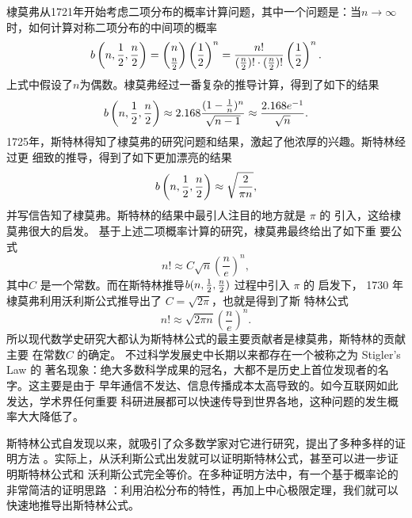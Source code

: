 {棣莫弗从1721年开始考虑二项分布的概率计算问题，其中一个问题是：当$n \rightarrow
\infty $时，如何计算对称二项分布的中间项的概率
$$ b\left(n, {1\over2}, {n \over 2}\right) = \binom{n}{{n \over 2}} 
\left(\frac{1}{2}\right)^n 
= \frac{n!}{({n\over 2})! \cdot ({n \over 2})!} \left(\frac{1}{2}\right)^n .$$
上式中假设了$n$为偶数。棣莫弗经过一番复杂的推导计算，得到了如下的结果
$$ b\left(n, {1\over2}, {n\over2}\right) \approx  2.168 \frac{(1 - {1\over n})^n} {\sqrt{n-1}} 
\approx \frac{2.168 e^{-1}}{\sqrt{n}}.$$
1725年，斯特林得知了棣莫弗的研究问题和结果，激起了他浓厚的兴趣。斯特林经过更
细致的推导，得到了如下更加漂亮的结果
$$ b\left(n, {1\over2}, {n\over2}\right) \approx \sqrt{\frac{2}{\pi n}} ,$$
并写信告知了棣莫弗。斯特林的结果中最引人注目的地方就是 $\pi$ 的
引入，这给棣莫弗很大的启发。 基于上述二项概率计算的研究，棣莫弗最终给出了如下重
要公式
$$ n! \approx C \sqrt{n} \left(\frac{n}{e}\right)^{n} ,$$
其中$C$ 是一个常数。而在斯特林推导$b(n, {1\over2}, {n\over2})$ 过程中引入 $\pi$ 的
启发下， 1730 年棣莫弗利用沃利斯公式推导出了 $C = \sqrt{2\pi}$，也就是得到了斯
特林公式
$$ n! \approx \sqrt{2\pi n} \left(\frac{n}{e}\right)^{n} .$$
所以现代数学史研究大都认为斯特林公式的最主要贡献者是棣莫弗，斯特林的贡献主要
在常数$C$ 的确定。 不过科学发展史中长期以来都存在一个被称之为 Stigler's Law 的
著名现象：绝大多数科学成果的冠名，大都不是历史上首位发现者的名字。这主要是由于
早年通信不发达、信息传播成本太高导致的。如今互联网如此发达，学术界任何重要
科研进展都可以快速传导到世界各地，这种问题的发生概率大大降低了。 

斯特林公式自发现以来，就吸引了众多数学家对它进行研究，提出了多种多样的证明方法
。实际上，从沃利斯公式出发就可以证明斯特林公式，甚至可以进一步证明斯特林公式和
沃利斯公式完全等价。在多种证明方法中，有一个基于概率论的非常简洁的证明思路
：利用泊松分布的特性，再加上中心极限定理，我们就可以快速地推导出斯特林公式。

}
